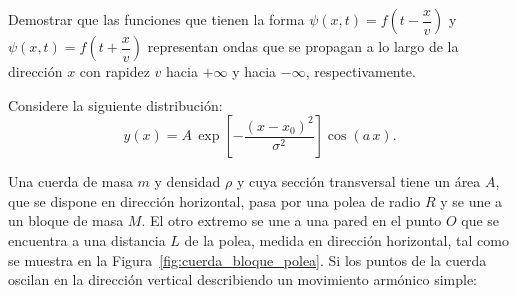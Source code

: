 \documentclass[addpoints]{exam}
\newcommand{\nn}{\mathbb{N}}
\begin{document}
\begin{questions}

    \question Demostrar que las funciones que tienen la forma $\psi \left(x,t\right) = f \left(t - \dfrac{x}{v}\right)$ y $\psi \left(x,t\right) = f \left(t + \dfrac{x}{v}\right)$ representan ondas que se propagan a lo largo de la dirección $x$ con rapidez $v$ hacia $+\infty$ y hacia $-\infty$, respectivamente.

    \question Considere la siguiente distribución: $$ y (x) = A \, \exp \left[- \frac{\left(x-x_0\right)^2}{\sigma^2} \right] \cos \left(a \, x\right). $$ 

    \question Una cuerda de masa $m$ y densidad $\rho$ y cuya sección transversal tiene un área $A$, que se dispone en dirección horizontal, pasa por una polea de radio $R$ y se une a un bloque de masa $M$. El otro extremo se une a una pared en el punto $O$ que se encuentra a una distancia $L$ de la polea, medida en dirección horizontal, tal como se muestra en la Figura~\ref{fig:cuerda_bloque_polea}. Si los puntos de la cuerda oscilan en la dirección vertical describiendo un movimiento armónico simple: \label{ej:cuerda_bloque_polea}


\end{questions}
\end{document}

